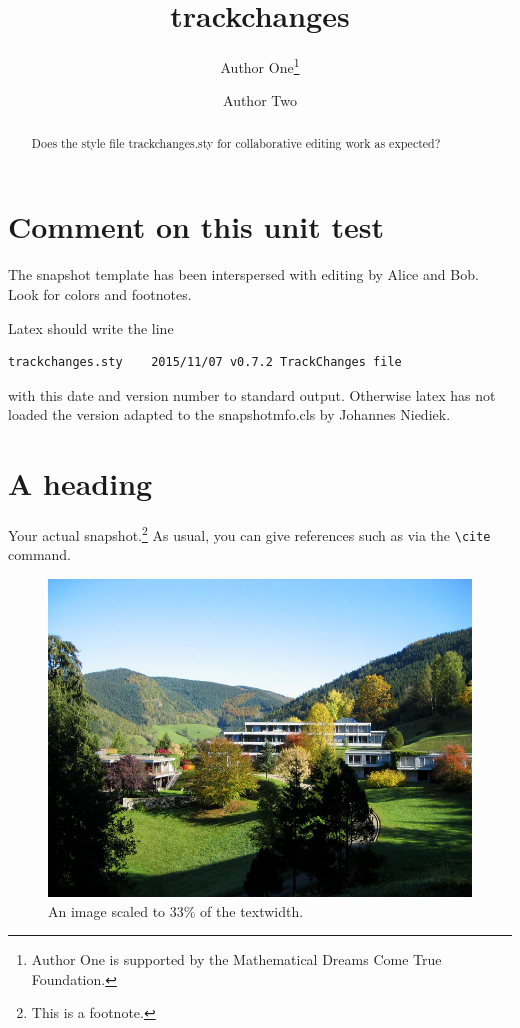 \documentclass{snapshotmfo}
\author{Author One\thanks{Author One is supported by the Mathematical Dreams Come True Foundation.} \and Author Two}
\title{trackchanges}
\begin{document}
\begin{abstract}
Does the style file trackchanges.sty for collaborative editing work as expected?
\end{abstract}

\section{Comment on this unit test}
The snapshot template has been interspersed with editing by Alice and Bob. Look for colors and footnotes.

Latex should write the line
\begin{verbatim}
trackchanges.sty    2015/11/07 v0.7.2 TrackChanges file 
\end{verbatim}
with this date and version number to standard output. Otherwise latex has not loaded the version
adapted to the snapshotmfo.cls by Johannes Niediek.

\section{A heading}
Your actual snapshot.\footnote{This is a footnote.} As usual, you can give references such as \cite{snapshot, knuth1984texbook, wikiMath, sample13, sample12, sample11, sample14} via the \verb+\cite+ command.


\begin{figure}[ht]
        \centering 
        \includegraphics[width= 0.33 \textwidth]{mfo.jpg}
        \caption{An image scaled to 33\% of the textwidth.}
\label{fig:sample-image}
\end{figure}
\end{document}
